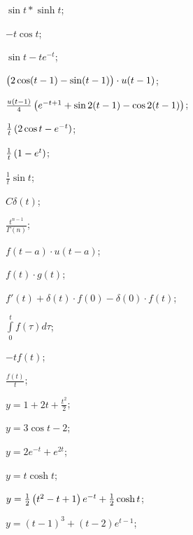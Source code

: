 \begin{enumsols}
		\item \( \sin{t} * \sinh{t} \); \sfill %
		\item \( -t \cos{t} \); \sfill %
		\item \( \sin{t} - te^{-t} \); \sfill %
		\item \( \bigl( 2\cos(t-1) - \sin(t-1) \bigr) \cdot u(t-1) \); \sfill %
		\item \( \frac{u(t-1)}{4} \left(  e^{-t+1} + \sin{2(t-1)} - \cos{2(t-1)}  \right) \); \sfill %
		\item \( \frac{1}{t} \left( 2 \cos{t} - e^{-t} \right) \); \sfill %
		\item \( \frac{1}{t} \left( 1 - e^t \right) \); \sfill %
		\item \( \frac{1}{t} \sin{t} \); \sfill %

		\item \( C \delta(t) \); \sfill %
		\item \( \frac{t^{n-1}}{\Gamma(n)} \); \sfill %
		\item \( f(t-a) \cdot u(t-a) \); \sfill %
		\item \( f(t) \cdot g(t) \); \sfill %
		\item \( f'(t) + \delta(t) \cdot f(0) - \delta(0) \cdot f(t) \); \sfill %
		\item \( \int\limits_0^t f(\tau) d \tau \); \sfill %
		\item \( -t f(t) \); \sfill %
		\item \( \frac{f(t)}{t} \); \sfill %

		\item \( y = 1 + 2t + \frac{t^2}{2} \); \sfill %
		\item \( y = 3 \cos{t} - 2 \); \sfill %
		\item \( y = 2e^{-t} + e^{2t} \); \sfill %
		\item \( y = t \cosh{t} \); \sfill %
		\item \( y = \frac{1}{2} \left( t^2 - t + 1 \right) e^{-t} + \frac{1}{2} \cosh{t} \); \sfill %
		\item \( y = (t-1)^3 + (t-2) e^{t-1} \); \sfill %


\end{enumsols}
